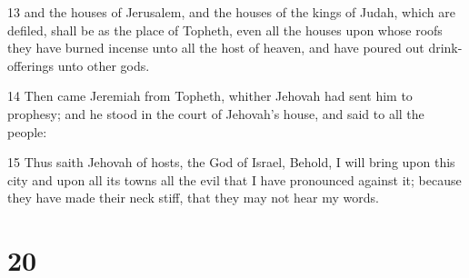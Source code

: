 \par 13 and the houses of Jerusalem, and the houses of the kings of Judah, which are defiled, shall be as the place of Topheth, even all the houses upon whose roofs they have burned incense unto all the host of heaven, and have poured out drink-offerings unto other gods.
\par 14 Then came Jeremiah from Topheth, whither Jehovah had sent him to prophesy; and he stood in the court of Jehovah's house, and said to all the people:
\par 15 Thus saith Jehovah of hosts, the God of Israel, Behold, I will bring upon this city and upon all its towns all the evil that I have pronounced against it; because they have made their neck stiff, that they may not hear my words.

\chapter{20}

